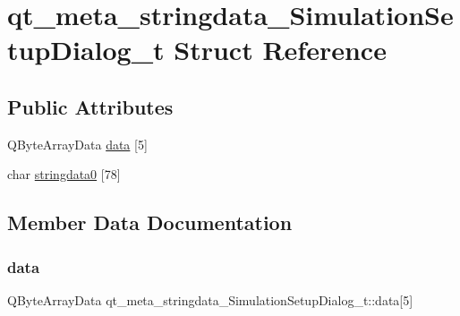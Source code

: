 \hypertarget{structqt__meta__stringdata___simulation_setup_dialog__t}{}\section{qt\+\_\+meta\+\_\+stringdata\+\_\+\+Simulation\+Setup\+Dialog\+\_\+t Struct Reference}
\label{structqt__meta__stringdata___simulation_setup_dialog__t}
\subsection*{Public Attributes}
\begin{DoxyCompactItemize}
\item 
Q\+Byte\+Array\+Data \mbox{\hyperlink{structqt__meta__stringdata___simulation_setup_dialog__t_aeb0b06e2b11a909898b67a9396e2685f}{data}} \mbox{[}5\mbox{]}
\item 
char \mbox{\hyperlink{structqt__meta__stringdata___simulation_setup_dialog__t_a7478cb77ba793931ff75d0a407a0b20f}{stringdata0}} \mbox{[}78\mbox{]}
\end{DoxyCompactItemize}


\subsection{Member Data Documentation}
\mbox{\label{structqt__meta__stringdata___simulation_setup_dialog__t_aeb0b06e2b11a909898b67a9396e2685f}} 
\subsubsection{\texorpdfstring{data}{data}}
{\footnotesize\ttfamily Q\+Byte\+Array\+Data qt\+\_\+meta\+\_\+stringdata\+\_\+\+Simulation\+Setup\+Dialog\+\_\+t\+::data\mbox{[}5\mbox{]}}

\mbox{\label{structqt__meta__stringdata___simulation_setup_dialog__t_a7478cb77ba793931ff75d0a407a0b20f}} 
